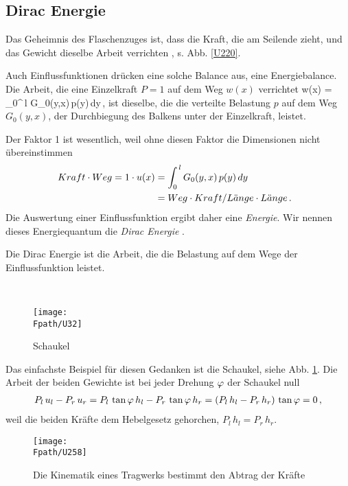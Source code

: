 {\textcolor{sectionTitleBlue}{\section{Dirac Energie}}}
Das Geheimnis des Flaschenzuges ist, dass die Kraft, die am Seilende zieht, und das Gewicht dieselbe Arbeit verrichten , s. Abb. \ref{U220}.

Auch Einflussfunktionen dr\"{u}cken eine solche Balance aus, eine Energiebalance. Die Arbeit, die eine Einzelkraft $P = 1$
auf dem Weg $w(x)$ verrichtet
 \cdot w(x) = \int_0^{\,l}  G_0(y,x)\,p(y)\,dy\,,
\eeq
ist dieselbe, die die verteilte Belastung $p$ auf dem Weg $G_0(y,x)$, der Durchbiegung des Balkens unter der Einzelkraft, leistet.

Der Faktor 1 ist wesentlich, weil ohne diesen Faktor die Dimensionen nicht \"{u}bereinstimmen
\begin{align}
\!\!\!\!\!Kraft \cdot Weg =  1 \cdot u(x) &= \int_0^{\,l} G_0(y, x)\,p(y)\,dy \nonumber \\
&= Weg \cdot Kraft/L\ddot{a}nge \cdot L\ddot{a}nge\,.
\end{align}
Die Auswertung einer Einflussfunktion ergibt daher eine {\em Energie\/}. Wir nennen dieses Energiequantum die {\em Dirac Energie\/}
.\\

\hspace*{-12pt}\colorbox{highlightBlue}{\parbox{0.98\textwidth}{Die Dirac Energie ist die Arbeit, die die Belastung auf dem Wege der Einflussfunktion leistet.}}\\

\begin{figure}[tbp]
\centering
\if {} \sidecaption \fi
\texttt{[image: \\Fpath/U32]}
\caption{Schaukel} \label{U32}
\end{figure}%

Das einfachste Beispiel f\"{u}r diesen Gedanken ist die Schaukel, siehe Abb. \ref{U32}. Die Arbeit der beiden Gewichte ist bei jeder Drehung $\varphi$ der Schaukel null
\begin{align}
P_l \, u_l - P_r \, u_r = P_l \,\tan \varphi \, h_l - P_r \, \tan \varphi \, h_r
= (P_l \, h_l - P_r \, h_r) \,\tan \varphi  = 0\,,
\end{align}
weil die beiden Kr\"{a}fte dem Hebelgesetz gehorchen, $P_l \, h_l = P_r \, h_r$.
\begin{figure}[tbp]
\centering
\if {} \sidecaption \fi
\texttt{[image: \\Fpath/U258]}
\caption{Die Kinematik eines Tragwerks bestimmt den Abtrag der Kr\"{a}fte} \label{U258}
\end{figure}%

